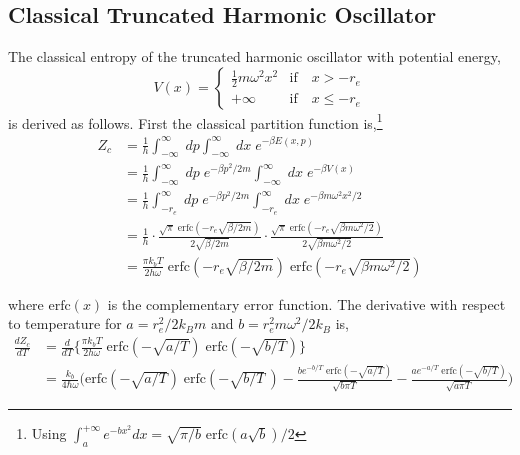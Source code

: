 \documentclass[../main.tex]{subfiles}
\begin{document}
\subsection{Classical Truncated Harmonic Oscillator}

The classical entropy of the truncated harmonic oscillator with potential energy, 
\begin{equation}
	V(x) = \begin{cases}
		\frac{1}{2}m\omega^2x^2 &\text{if} \quad x > -r_e \\
		+\infty &\text{if} \quad x \le -r_e
	\end{cases} 
\end{equation}
is derived as follows. First the classical partition function is,\footnote{Using $\int_{a}^{+\infty}  e^{-bx^2} dx = \sqrt{\pi/b}\;\text{erfc}(a\sqrt{b})/2$}
\begin{equation}
	\begin{aligned}
		Z_c &= \frac{1}{h}\int_{-\infty}^\infty \; dp\int_{-\infty}^{\infty} \; dx \; e^{-\beta E(x,p)} \\
		&= \frac{1}{h}\int_{-\infty}^\infty \; dp \; e^{-\beta p^2/2m} \int_{-\infty}^{\infty} \; dx \; e^{-\beta V(x)} \\
		&= \frac{1}{h}\int_{-r_e}^\infty \; dp \; e^{-\beta p^2/2m} \int_{-r_e}^{\infty} \; dx \; e^{-\beta m\omega^2x^2/2} \\
		&=\frac{1}{h}\cdot \frac{\sqrt{\pi}\;\text{erfc}(-r_e \sqrt{\beta/2m})}{2\sqrt{\beta/2m}}\cdot \frac{\sqrt{\pi}\;\text{erfc}(-r_e \sqrt{\beta m\omega^2/2})}{2\sqrt{\beta m\omega^2/2}} \\
		&=\frac{\pi k_b T}{2h\omega} \;\text{erfc}(-r_e \sqrt{\beta/2m})\;\text{erfc}(-r_e \sqrt{\beta m\omega^2/2})
	\end{aligned}
\end{equation}

where $\text{erfc}(x)$ is the complementary error function. The derivative with respect to temperature for $a = r_e^2/ 2k_B m$ and $b = r_e^2m\omega^2/2k_B$ is, 
\begin{equation}
	\begin{aligned}
		\frac{d Z_c}{dT} &= \frac{d}{dT} {\Big \{} \frac{\pi k_b T}{2h\omega} \;\text{erfc}(- \sqrt{a/T})\;\text{erfc}(- \sqrt{b/T}) {\Big \}} \\
		&= \frac{ k_b}{4\hbar\omega} {\Bigg (} \text{erfc}(- \sqrt{a/T})\;\text{erfc}(- \sqrt{b/T}\,) - \frac{b e^{-b/T} \; \text{erfc}(-\sqrt{a/T})}{\sqrt{b\pi T}} - \frac{a e^{-a/T} \; \text{erfc}(-\sqrt{b/T})}{\sqrt{a\pi T}} {\Bigg )}
	\end{aligned}
\end{equation}
\end{document}
